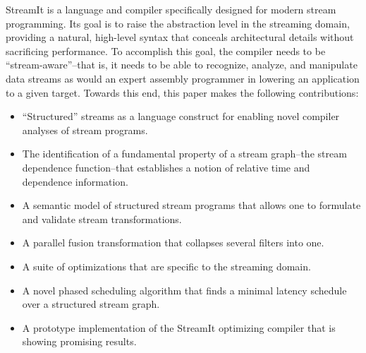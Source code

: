 StreamIt is a language and compiler specifically designed for modern
stream programming.  Its goal is to raise the abstraction level in the
streaming domain, providing a natural, high-level syntax that conceals
architectural details without sacrificing performance.  To accomplish
this goal, the compiler needs to be ``stream-aware''--that is, it
needs to be able to recognize, analyze, and manipulate data streams as
would an expert assembly programmer in lowering an application to a
given target.  Towards this end, this paper makes the following
contributions:
\begin{itemize}

\item ``Structured'' streams as a language construct for enabling
  novel compiler analyses of stream programs.
  
\item The identification of a fundamental property of a stream
  graph--the stream dependence function--that establishes a notion of
  relative time and dependence information.

\item A semantic model of structured stream programs that allows one
  to formulate and validate stream transformations.

\item A parallel fusion transformation that collapses several filters
  into one.

\item A suite of optimizations that are specific to the streaming
  domain.

\item A novel phased scheduling algorithm that finds a minimal latency
schedule over a structured stream graph.

\item A prototype implementation of the StreamIt optimizing compiler
  that is showing promising results.

\end{itemize}

